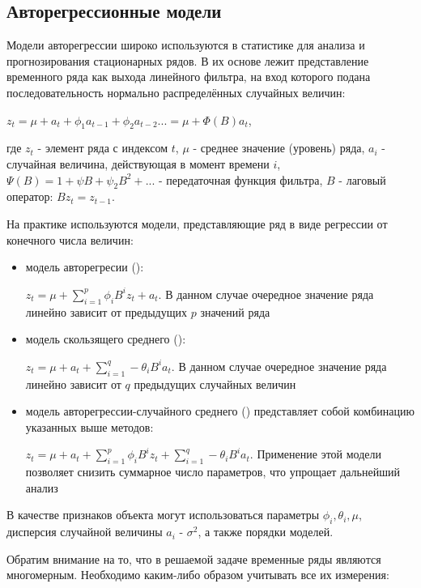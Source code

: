 \subsection{Авторегрессионные модели}

Модели авторегрессии широко используются в статистике для анализа и прогнозирования стационарных рядов. В их основе лежит представление временного ряда как выхода линейного фильтра, на вход которого подана последовательность нормально распределённых случайных величин:

$z_t=\mu+a_t+\phi_1a_{t-1}+\phi_2a_{t-2}...=\mu+\Phi(B)a_t$, 

где $z_t$ - элемент ряда с индексом $t$, $\mu$ - среднее значение (уровень) ряда, $a_i$ - случайная величина, действующая в момент времени $i$, $\Psi(B)=1+\psi B+\psi_2 B^2+...$ - передаточная функция фильтра, $B$ - лаговый оператор: $Bz_t=z_{t-1}$.

На практике используются модели, представляющие ряд в виде регрессии от конечного числа величин\cite{bj_ts}: 

\begin{itemize}
\item модель авторегресии (): 

$z_t=\mu+\sum_{i=1}^p \phi_iB^i z_t + a_t$. В данном случае очередное значение ряда линейно зависит от предыдущих $p$ значений ряда
\item модель скользящего среднего ():

$z_t=\mu + a_t + \sum_{i=1}^q -\theta_iB^i a_t $. В данном случае очередное значение ряда линейно зависит от $q$ предыдущих случайных величин
\item модель авторегрессии-случайного среднего () представляет собой комбинацию указанных выше методов:

$z_t=\mu + a_t + \sum_{i=1}^p \phi_iB^i z_t + \sum_{i=1}^q -\theta_iB^i a_t $. Применение этой модели позволяет снизить суммарное число параметров, что упрощает дальнейший анализ
\end{itemize}

В качестве признаков объекта могут использоваться параметры $\phi_i, \theta_i, \mu$, дисперсия случайной величины $a_i$ - $\sigma^2$, а также порядки моделей.

Обратим внимание на то, что в решаемой задаче временные ряды являются многомерным. Необходимо каким-либо образом учитывать все их измерения:

